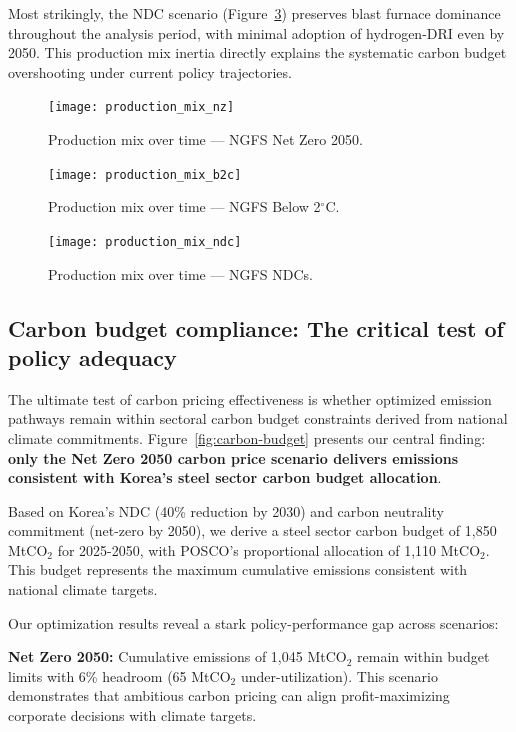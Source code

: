 \documentclass[preprint,1p,authoryear]{elsarticle}
\begin{document}
Most strikingly, the NDC scenario (Figure~\ref{fig:mix-ndc}) preserves blast furnace dominance throughout the analysis period, with minimal adoption of hydrogen-DRI even by 2050. This production mix inertia directly explains the systematic carbon budget overshooting under current policy trajectories.

\begin{figure}[!t]
  \centering
  \texttt{[image: production\_mix\_nz]}
  \caption{Production mix over time --- NGFS Net Zero 2050.}
  \label{fig:mix-nz}
\end{figure}

\begin{figure}[!t]
  \centering
  \texttt{[image: production\_mix\_b2c]}
  \caption{Production mix over time --- NGFS Below 2$^\circ$C.}
  \label{fig:mix-b2c}
\end{figure}

\begin{figure}[!t]
  \centering
  \texttt{[image: production\_mix\_ndc]}
  \caption{Production mix over time --- NGFS NDCs.}
  \label{fig:mix-ndc}
\end{figure}

\subsection{Carbon budget compliance: The critical test of policy adequacy}

The ultimate test of carbon pricing effectiveness is whether optimized emission pathways remain within sectoral carbon budget constraints derived from national climate commitments. Figure~\ref{fig:carbon-budget} presents our central finding: \textbf{only the Net Zero 2050 carbon price scenario delivers emissions consistent with Korea's steel sector carbon budget allocation}.

Based on Korea's NDC (40\% reduction by 2030) and carbon neutrality commitment (net-zero by 2050), we derive a steel sector carbon budget of 1,850 MtCO$_2$ for 2025-2050, with POSCO's proportional allocation of 1,110 MtCO$_2$. This budget represents the maximum cumulative emissions consistent with national climate targets.

Our optimization results reveal a stark policy-performance gap across scenarios:

\textbf{Net Zero 2050:} Cumulative emissions of 1,045 MtCO$_2$ remain within budget limits with 6\% headroom (65 MtCO$_2$ under-utilization). This scenario demonstrates that ambitious carbon pricing can align profit-maximizing corporate decisions with climate targets.
\end{document}
